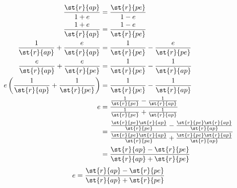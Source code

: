 \documentclass[../basicOrbitalDynamics.tex]{subfiles}
\begin{document}
\begin{align*}
    \frac{\st{r}{ap}}{1+e}                                   & =\frac{\st{r}{pe}}{1-e}                                                                                                                                                             \\
    \frac{1+e}{\st{r}{ap}}                                   & =\frac{1-e}{\st{r}{pe}}                                                                                                                                                             \\
    \frac{1}{\st{r}{ap}}+\frac{e}{\st{r}{ap}}               & =\frac{1}{\st{r}{pe}}-\frac{e}{\st{r}{pe}}                                                                                                                                         \\
    \frac{e}{\st{r}{ap}}+\frac{e}{\st{r}{pe}}               & =\frac{1}{\st{r}{pe}}-\frac{1}{\st{r}{ap}}                                                                                                                                         \\
    e\left(\frac{1}{\st{r}{ap}}+\frac{1}{\st{r}{pe}}\right) & =\frac{1}{\st{r}{pe}}-\frac{1}{\st{r}{ap}}                                                                                                                                         \\
    e                                                         & =\frac{\frac{1}{\st{r}{pe}}-\frac{1}{\st{r}{ap}}}{\frac{1}{\st{r}{pe}}+\frac{1}{\st{r}{ap}}}                                                                                     \\
                                                              & =\frac{\frac{\st{r}{pe}\st{r}{ap}}{\st{r}{pe}}-\frac{\st{r}{pe}\st{r}{ap}}{\st{r}{ap}}}{\frac{\st{r}{pe}\st{r}{ap}}{\st{r}{pe}}+\frac{\st{r}{pe}\st{r}{ap}}{\st{r}{ap}}} \\
                                                              & =\frac{\st{r}{ap}-\st{r}{pe}}{\st{r}{ap}+\st{r}{pe}}                                                                                                                             \\
\end{align*}
\begin{equation}\label{Accentricity in terms of apses}
    e=\frac{\st{r}{ap}-\st{r}{pe}}{\st{r}{ap}+\st{r}{pe}}
\end{equation}
\end{document}
